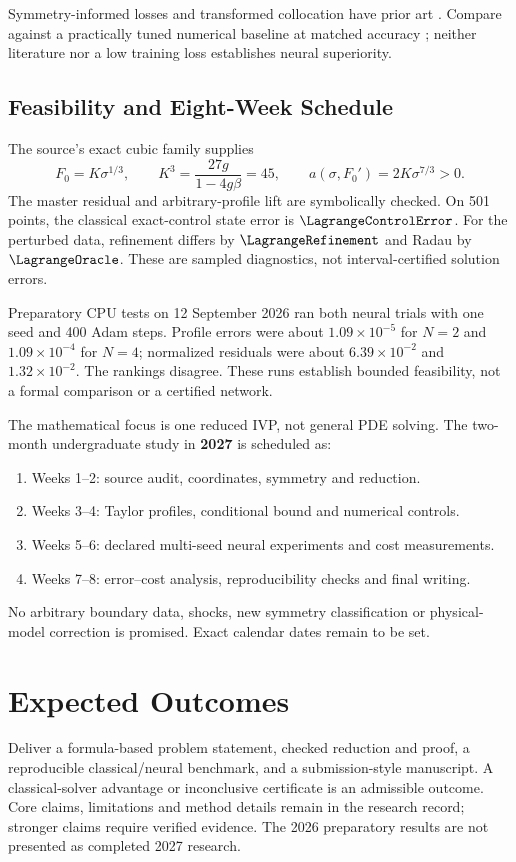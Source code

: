 \documentclass[12pt,a4paper]{article}
\begin{document}
Symmetry-informed losses and transformed collocation have prior art \cite{liepinn,shah}. Compare against a practically tuned numerical baseline at matched accuracy \cite{baselines}; neither literature nor a low training loss establishes neural superiority.

\newpage
\subsection{Feasibility and Eight-Week Schedule}
The source's exact cubic family supplies
\[
F_0=K\sigma^{1/3},\qquad
K^3=\frac{27g}{1-4g\beta}=45,\qquad
a(\sigma,F_0')=2K\sigma^{7/3}>0.
\]
The master residual and arbitrary-profile lift are symbolically checked. On 501 points, the classical exact-control state error is $\LagrangeControlError$. For the perturbed data, refinement differs by $\LagrangeRefinement$ and Radau by $\LagrangeOracle$. These are sampled diagnostics, not interval-certified solution errors.

Preparatory CPU tests on 12 September 2026 ran both neural trials with one seed and 400 Adam steps. Profile errors were about $1.09\times10^{-5}$ for $N=2$ and $1.09\times10^{-4}$ for $N=4$; normalized residuals were about $6.39\times10^{-2}$ and $1.32\times10^{-2}$. The rankings disagree. These runs establish bounded feasibility, not a formal comparison or a certified network.

The mathematical focus is one reduced IVP, not general PDE solving. The two-month undergraduate study in \textbf{2027} is scheduled as:
\begin{enumerate}
\item Weeks 1--2: source audit, coordinates, symmetry and reduction.
\item Weeks 3--4: Taylor profiles, conditional bound and numerical controls.
\item Weeks 5--6: declared multi-seed neural experiments and cost measurements.
\item Weeks 7--8: error--cost analysis, reproducibility checks and final writing.
\end{enumerate}
No arbitrary boundary data, shocks, new symmetry classification or physical-model correction is promised. Exact calendar dates remain to be set.

\section{Expected Outcomes}
Deliver a formula-based problem statement, checked reduction and proof, a reproducible classical/neural benchmark, and a submission-style manuscript. A classical-solver advantage or inconclusive certificate is an admissible outcome. Core claims, limitations and method details remain in the research record; stronger claims require verified evidence. The 2026 preparatory results are not presented as completed 2027 research.

\newpage

\end{document}
